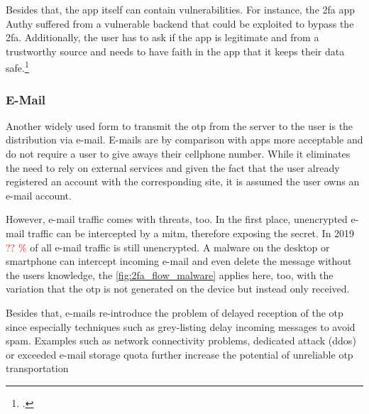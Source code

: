 Besides that, the app itself can contain vulnerabilities. For instance, the \gls{2fa} app Authy suffered from a vulnerable backend that could be exploited to bypass the \gls{2fa}. Additionally, the user has to ask if the app is legitimate and from a trustworthy source and needs to have faith in the app that it keeps their data safe.\footcites[See][]{eset-bypass2fa}[See][]{sakurity-authy}
 
\subsubsection{E-Mail}

Another widely used form to transmit the \gls{otp} from the server to the user is the distribution via e-mail. E-mails are by comparison with apps more acceptable and do not require a user to give aways their cellphone number. While it eliminates the need to rely on external services and given the fact that the user already registered an account with the corresponding site, it is assumed the user owns an e-mail account.

However, e-mail traffic comes with threats, too. In the first place, unencrypted e-mail traffic can be intercepted by a \gls{mitm}, therefore exposing the secret. In 2019 \textcolor{red}{?? \%} of all e-mail traffic is still unencrypted. A malware on the desktop or smartphone can intercept incoming e-mail and even delete the message without the users knowledge, the \autoref{fig:2fa_flow_malware} applies here, too, with the variation that the \gls{otp} is not generated on the device but instead only received.

Besides that, e-mails re-introduce the problem of delayed reception of the \gls{otp} since especially techniques such as grey-listing delay incoming messages to avoid spam. Examples such as network connectivity problems, dedicated attack (\gls{ddos}) or exceeded e-mail storage quota further increase the potential of unreliable \gls{otp} transportation